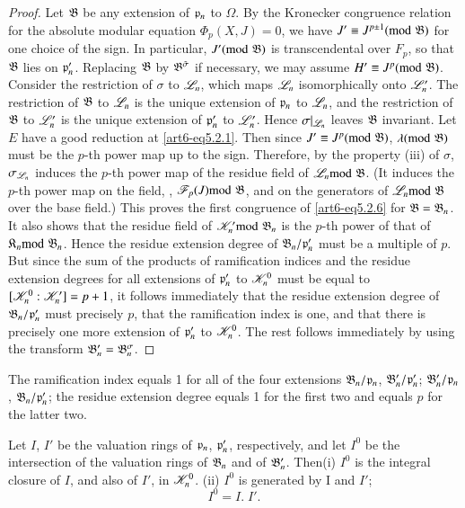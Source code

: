 \begin{itemize}
\begin{proof}
Let $\mathfrak{B}$ be any extension of $\mathfrak{p}_n$ to $\Omega$. By the Kronecker congruence relation for the absolute modular equation $\Phi_p (X, J) = 0$, we have $J' \equiv J^{p\pm 1} ({\rm{mod}}\kern.3em \mathfrak{B})$ for one choice of the sign. In particular, $J' ({\rm{mod}}\kern.3em \mathfrak{B})$ is transcendental over $F_p$, so that $\mathfrak{B}$ lies on $\mathfrak{p}'_n$. Replacing $\mathfrak{B}$  by $\mathfrak{B}^{\tilde{\sigma}}$ if necessary, we may assume $H' \equiv J^p ({\rm{mod}}\kern.3em \mathfrak{B})$. Consider the restriction of $\sigma$ to $\mathscr{L}_n$, which maps $\mathscr{L}_n$ isomorphically onto $\mathscr{L}'_n$. The restriction of $\mathfrak{B}$ to $\mathscr{L}_n$ is the unique extension of $\mathfrak{p}_n$ to $\mathscr{L}_n$, and the restriction of $\mathfrak{B}$ to $\mathscr{L}'_n$ is the unique extension of $\mathfrak{p}'_n$ to $\mathscr{L}'_n$. Hence $\sigma|_{\mathscr{L}_n}$ leaves $\mathfrak{B}$ invariant. Let $E$ have a good reduction at \eqref{art6-eq5.2.1}. Then since $J' \equiv J^p ({\rm{mod}}\kern.3em \mathfrak{B})$, $\lambda ({\rm{mod}}\kern.3em \mathfrak{B})$ must be the $p$-th power map up to the sign. Therefore, by the property (iii) of $\sigma$, $\sigma_{\mathscr{L}_n}$ induces the $p$-th power map of the residue field of $\mathscr{L}_n {\rm{mod}}\kern.3em \mathfrak{B}$. (It induces the $p$-th power map on the field, \ie, $\mathscr{F}_p(J){\rm{mod}}\kern.3em \mathfrak{B}$, and on the generators of $\mathscr{L}_n {\rm{mod}}\kern.3em \mathfrak{B}$ over the base field.) This proves the first congruence of \eqref{art6-eq5.2.6} for $\mathfrak{B}= \mathfrak{B}_n$. It also shows that the residue field of $\mathscr{K}'_n {\rm{mod}}\kern.3em \mathfrak{B}_n$ is the $p$-th power of that of $\mathfrak{K}_n {\rm{mod}}\kern.3em \mathfrak{B}_n$. Hence the residue extension degree of $\mathfrak{B}_n/\mathfrak{p}'_n$ must be a multiple of $p$. But since the sum of the products of ramification indices and the residue extension degrees for all extensions of $\mathfrak{p}'_n$ to $\mathscr{K}^0_n$ must be equal to $[\mathscr{K}^0_n: \mathscr{K}'_n] = p+1$, it follows immediately that the residue extension degree of $\mathfrak{B}_n / \mathfrak{p}'_n$ must precisely $p$, that the ramification index is one, and that there is precisely one more extension of $\mathfrak{p}'_n$ to $\mathscr{K}^0_n$. The rest follows immediately by using the transform $\mathfrak{B}'_n = \mathfrak{B}^\sigma_n$.
\end{proof}

\setcounter{corollary}{0}
\begin{corollary}\label{art6-pcoro1}
The ramification index equals 1 for all of the four extensions $\mathfrak{B}_n / \mathfrak{p}_n$, $\mathfrak{B}'_n/ \mathfrak{p}'_n$; $\mathfrak{B}'_n/ \mathfrak{p}_n$, $\mathfrak{B}_n/\mathfrak{p}'_n$; the residue extension degree equals 1 for the first two and equals $p$ for the latter two.
\end{corollary}

\begin{corollary}\label{art6-pcoro2}
Let $I$, $I'$ be the valuation rings of $\mathfrak{p}_n$, $\mathfrak{p}'_n$, respectively, and let $I^0$ be the intersection of the valuation rings of $\mathfrak{B}_n$ and of $\mathfrak{B}'_n$.
Then\pageoriginale (i) $I^0$ is the integral closure of $I$, and also of $I'$, in $\mathscr{K}^0_n$. (ii) $I^0$ is generated by I and $I'$;
\begin{equation}
I^0 = I.\; I'.
\label{art6-eq5.2.7}
\end{equation}
\end{corollary}


\end{itemize}
